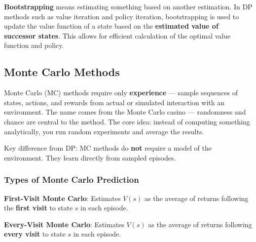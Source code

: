 \documentclass[11pt,a4paper]{article}
\begin{document}
\textbf{Bootstrapping} means estimating something based on another estimation. In DP methods such as value iteration and policy iteration, bootstrapping is used to update the value function of a state based on the \textbf{estimated value of successor states}. This allows for efficient calculation of the optimal value function and policy.

\subsection{Monte Carlo Methods}

Monte Carlo (MC) methods require only \textbf{experience} --- sample sequences of states, actions, and rewards from actual or simulated interaction with an environment. The name comes from the Monte Carlo casino --- randomness and chance are central to the method. The core idea: instead of computing something analytically, you run random experiments and average the results.

Key difference from DP: MC methods do \textbf{not} require a model of the environment. They learn directly from sampled episodes.

\subsubsection{Types of Monte Carlo Prediction}

\textbf{First-Visit Monte Carlo}: Estimates $V(s)$ as the average of returns following the \textbf{first visit} to state $s$ in each episode.

\textbf{Every-Visit Monte Carlo}: Estimates $V(s)$ as the average of returns following \textbf{every visit} to state $s$ in each episode.
\end{document}
